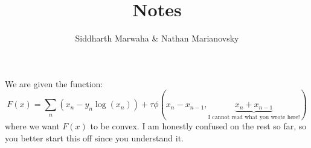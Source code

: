 \documentclass[12pt, letterpaper, onecolumn, conference, final]{IEEEtran}
\title{Notes}
\author{Siddharth Marwaha \& Nathan Marianovsky}
\theoremstyle{definition}
\theoremstyle{plain}
\begin{document}
\maketitle

\noindent
We are given the function:
\begin{equation*}
F(x) = \sum_n (x_n - y_n\log(x_n)) + \tau\phi(x_n - x_{n - 1}, \underbrace{x_n + x_{n - 1}}_{\text{I cannot read what you wrote here!}})
\end{equation*}
where we want $F(x)$ to be convex.
\newline
\newline
I am honestly confused on the rest so far, so you better start this off since you understand it.
\end{document}
